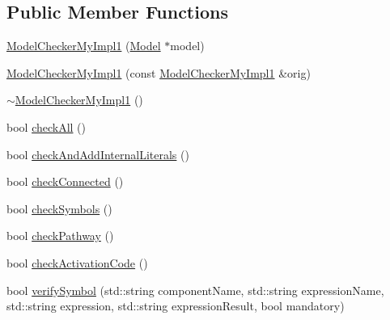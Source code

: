 \subsection*{Public Member Functions}
\begin{DoxyCompactItemize}
\item 
\hyperlink{class_model_checker_my_impl1_a1e20144586ebb7290ee270ed4f61d322}{Model\-Checker\-My\-Impl1} (\hyperlink{class_model}{Model} $\ast$model)
\item 
\hyperlink{class_model_checker_my_impl1_ad66b5eebec60d37add1629f96e9488ce}{Model\-Checker\-My\-Impl1} (const \hyperlink{class_model_checker_my_impl1}{Model\-Checker\-My\-Impl1} \&orig)
\item 
\hyperlink{class_model_checker_my_impl1_acd10fffc264cf286a304fce9538a7189}{$\sim$\-Model\-Checker\-My\-Impl1} ()
\item 
bool \hyperlink{class_model_checker_my_impl1_adbed52d807b882ee75f10372b8b379e1}{check\-All} ()
\item 
bool \hyperlink{class_model_checker_my_impl1_aa6dc0de6220d37a63a3037a090335d61}{check\-And\-Add\-Internal\-Literals} ()
\item 
bool \hyperlink{class_model_checker_my_impl1_a2a7abd0bdf163415ec9aa92741ea5d03}{check\-Connected} ()
\item 
bool \hyperlink{class_model_checker_my_impl1_a37856818d6597563f079401bf6652cbb}{check\-Symbols} ()
\item 
bool \hyperlink{class_model_checker_my_impl1_afd162b06a60ec5bf1e3a4f3340728ac3}{check\-Pathway} ()
\item 
bool \hyperlink{class_model_checker_my_impl1_a1139d516075b03d96eaa0db01e108c2c}{check\-Activation\-Code} ()
\item 
bool \hyperlink{class_model_checker_my_impl1_af92c7b51b8207c1718b496df104b1f11}{verify\-Symbol} (std\-::string component\-Name, std\-::string expression\-Name, std\-::string expression, std\-::string expression\-Result, bool mandatory)
\end{DoxyCompactItemize}


